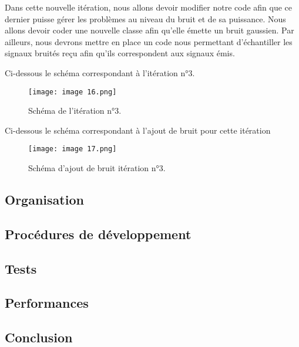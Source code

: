 Dans cette nouvelle itération, nous allons devoir modifier notre code afin que ce dernier puisse gérer les problèmes au niveau du bruit et de sa puissance. Nous allons devoir coder une nouvelle classe afin qu'elle émette un bruit gaussien. Par ailleurs, nous devrons mettre en place un code nous permettant d'échantiller les signaux bruités reçu afin qu'ils correspondent aux signaux émis.

Ci-dessous le schéma correspondant à l'itération n°3.

\begin{figure}[h]
    \centering
    \texttt{[image: image 16.png]}
    \caption{\label{fig:image16}Schéma de l'itération n°3.}
\end{figure}

Ci-dessous le schéma correspondant à l'ajout de bruit pour cette itération

\begin{figure}[h]
    \centering
    \texttt{[image: image 17.png]}
    \caption{\label{fig:image17}Schéma d'ajout de bruit itération n°3.}
\end{figure}


\subsection{Organisation}

\subsection{Procédures de développement}

\subsection{Tests}

\subsection{Performances}

\subsection{Conclusion}